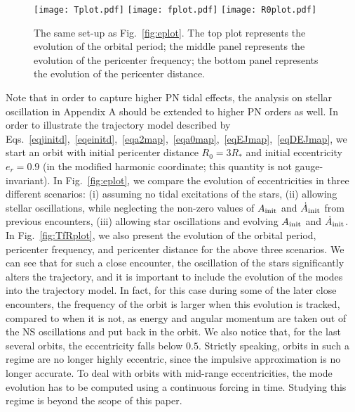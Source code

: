 \documentclass[prd,aps,floatfix,superscriptaddress,nofootinbib,twocolumn,10pt,English]{revtex4}
\begin{document}
\begin{widetext}
\end{widetext}

\begin{figure}[tb]
\texttt{[image: Tplot.pdf]}
\texttt{[image: fplot.pdf]}
\texttt{[image: R0plot.pdf]}
\caption{The same set-up as Fig.~\ref{fig:eplot}. The top plot represents the evolution of the orbital period; the middle panel represents the evolution of the pericenter frequency; the bottom panel represents the evolution of the pericenter distance.}
\label{fig:TfRplot}
\end{figure}
Note that in order to capture  higher PN tidal effects, the analysis on stellar oscillation in Appendix A should be extended to higher PN orders as well.
In order to illustrate the trajectory model described by
Eqs.~\eqref{eqjinitd},~\eqref{eqeinitd},~\eqref{eqa2map},~\eqref{eqa0map},~\eqref{eqEJmap},~\eqref{eqDEJmap},
we start an orbit with initial pericenter distance $R_0 = 3 R_*$ and initial
eccentricity $e_r =0.9$ (in the modified harmonic coordinate; this quantity is not
gauge-invariant). In Fig.~\ref{fig:eplot}, we compare the evolution of
eccentricities in three different scenarios: (i) assuming no tidal excitations of the stars,
(ii) allowing stellar oscillations, while neglecting the non-zero values of 
$A_{\rm init}$ and $\dot{A}_{\rm init}$ from previous encounters, (iii) allowing star
oscillations and evolving $A_{\rm init}$ and $\dot{A}_{\rm init}$.
In Fig.~\eqref{fig:TfRplot}, we also present the evolution of  
the orbital period, pericenter frequency, and pericenter distance for the above
three scenarios. We can see that for such a close encounter, the oscillation of the
stars significantly alters the trajectory, and it is important to include the
evolution of the modes into the trajectory model. 
In fact, for this case during some of the later close encounters, the frequency of the
orbit is larger when this evolution is tracked, compared to when it is not,
as energy and angular momentum are taken out
of the NS oscillations and put back in the orbit.  
We also notice that, for the last
several orbits, the eccentricity falls below $0.5$. Strictly speaking, orbits
in such a regime are no longer highly eccentric, since the impulsive
approximation is no longer accurate. To deal with orbits with mid-range
eccentricities, the mode evolution has to be computed using a continuous forcing
in time. Studying this regime is beyond the scope of this paper.
\end{document}
